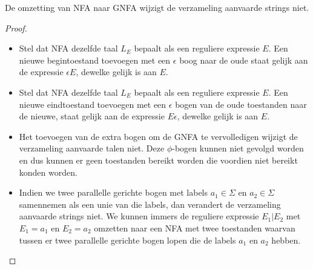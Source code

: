 \documentclass[../aanvullingen_cursus.tex]{subfiles}
\begin{document}
\begin{stelling}
	De omzetting van NFA naar GNFA wijzigt de verzameling aanvaarde strings niet.
\end{stelling}

\begin{proof}
	\hfill
	\begin{itemize}
		\item Stel dat NFA dezelfde taal $L_E$ bepaalt als een reguliere expressie $E$. Een nieuwe begintoestand toevoegen met een $\epsilon$ boog naar de oude staat gelijk aan de expressie $\epsilon E$, dewelke gelijk is aan $E$.
		\item Stel dat NFA dezelfde taal $L_E$ bepaalt als een reguliere expressie $E$. Een nieuwe eindtoestand toevoegen met een $\epsilon$ bogen van de oude toestanden naar de nieuwe, staat gelijk aan de expressie $E\epsilon$, dewelke gelijk is aan $E$.
		\item Het toevoegen van de extra bogen om de GNFA te vervolledigen wijzigt de verzameling aanvaarde talen niet. Deze $\phi$-bogen kunnen niet gevolgd worden en dus kunnen er geen toestanden bereikt worden die voordien niet bereikt konden worden.
		\item Indien we twee parallelle gerichte bogen met labels $a_1 \in \Sigma$ en $a_2 \in \Sigma$ samennemen als een unie van die labels, dan verandert de verzameling aanvaarde strings niet. We kunnen immers de reguliere expressie $E_1|E_2$ met $E_1 = a_1$ en $E_2 = a_2$ omzetten naar een NFA met twee toestanden waarvan tussen er twee parallelle gerichte bogen lopen die de labels $a_1$ en $a_2$ hebben.
	\end{itemize}
\end{proof}
\end{document}
